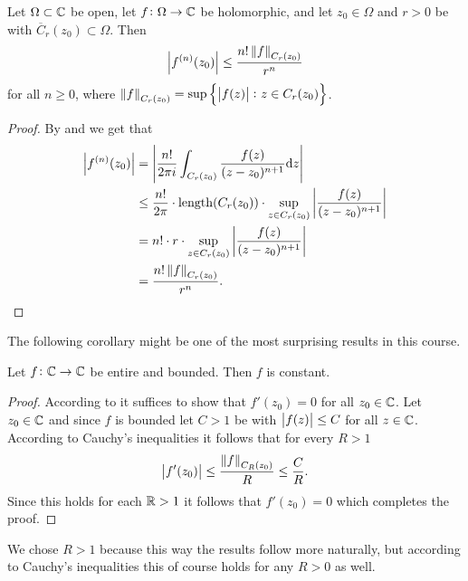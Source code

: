 \documentclass[11pt,a4paper]{article}
\begin{document}
\begin{corollary}
  Let $\Omega \subset \mathbb{C}$ be open,
  let $f \colon \Omega \to \mathbb{C}$ be holomorphic,
  and let $z_0 \in \Omega$ and $r > 0$ be with
  $\overline C_r(z_0) \subset \Omega$.
  Then
  \[
    \left\lvert f^{(n)}(z_0)\right\rvert \le
    \frac{n! \left\lVert f\right\rVert_{C_r(z_0)}}{r^n}
  \]
  for all $n \geq 0$, where
  $\left\lVert f\right\rVert_{C_r(z_0)} = \sup\left\{\left\lvert f(z)\right\rvert \colon z \in C_r(z_0)\right\}$.
\end{corollary}
\begin{proof}
  By  and  we get that
  \begin{align*}
    \left\lvert f^{(n)}(z_0)\right\rvert &=
    \left\lvert\frac{n!}{2 \pi i} \int_{C_r(z_0)} \frac{f(z)}{(z - z_0)^{n+1}} \mathrm{d} z\right\rvert \\
                       &\le
    \frac{n!}{2 \pi} \cdot
    \mathrm{length}(C_r(z_0)) \cdot 
    \sup_{z \in C_r(z_0)} \left\lvert\frac{f(z)}{(z - z_0)^{n+1}}\right\rvert \\ &=
    n! \cdot r \cdot
    \sup_{z \in C_r(z_0)} \left\lvert\frac{f(z)}{(z - z_0)^{n+1}}\right\rvert \\ &=
    \frac{n! \left\lVert f\right\rVert_{C_r(z_0)}}{r^n}.
  \end{align*}
\end{proof}

\begin{remark}
The following corollary might be one of the most surprising results
in this course.
\end{remark}

\begin{corollary}
  Let $f \colon \mathbb{C} \to \mathbb{C}$ be entire and bounded.
  Then $f$ is constant.
\end{corollary}
\begin{proof}
  According to  it suffices to show
  that $f'(z_0) = 0$ for all $z_0 \in \mathbb{C}$.
  Let $z_0 \in \mathbb{C}$
  and since $f$ is bounded let $C > 1$ be with $\left\lvert f(z)\right\rvert \le C$
  for all $z \in \mathbb{C}$.
  According to Cauchy's inequalities it follows that for every $R > 1$
  \[
    \left\lvert f'(z_0)\right\rvert \le
    \frac{\left\lVert f\right\rVert_{C_R(z_0)}}{R} \le
    \frac{C}{R}.
  \]
  Since this holds for each $\mathbb{R} > 1$ it follows that $f'(z_0) = 0$
  which completes the proof.
\end{proof}
\begin{remark}
  We chose $R > 1$ because this way the results follow more naturally,
  but according to Cauchy's inequalities this of course holds for
  any $R > 0$ as well.
\end{remark}
\end{document}
